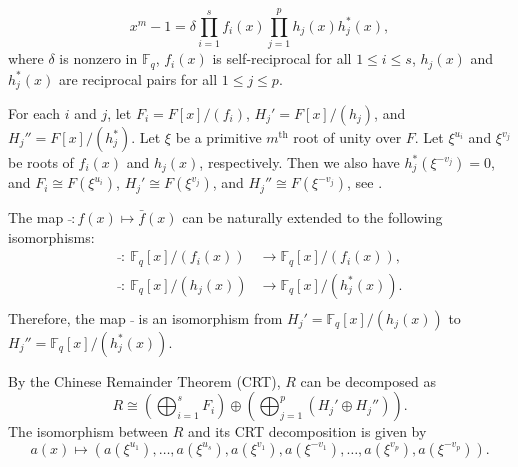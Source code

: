 \documentclass[a4paper,12pt]{article}
\begin{document}
$$
x^m-1= \delta \prod_{i=1}^sf_i(x) \prod_{j=1}^p h_j(x)h^*_j(x),
$$
where $\delta$ is nonzero in $\mathbb{F}_q$, $f_i(x)$ is self-reciprocal for all $1\le i \le s$,  $h_j(x)$   and $h_j^*(x)$ are reciprocal pairs for all $1 \le j \le p$.

For each $i$ and $j$, let $F_i=F[x]/  (f_i )$, 
$H_j'= F[x]/ (h_j )$,   and
$H_j''= F[x]/ (h_j^* )$. 
Let $\xi$ be a primitive $m^{\text{th}}$ root of unity over $F$.
Let $\xi^{u_i}$ and  $\xi^{v_j}$ be roots of $f_i(x)$ and $h_j(x)$, respectively.
Then we also have $h_j^*(\xi^{-v_j})=0$, and
$F_i \cong F(\xi^{u_i})$, $H_j' \cong F(\xi^{v_j})$, and $H_j'' \cong F(\xi^{-v_j})$, see \cite[p. 136]{guneri2021}.






The map $\bar\ : f(x) \mapsto \bar{f}(x)$ can be naturally extended to the following isomorphisms:   
\begin{equation}
	\begin{split}
		\bar\  :\  \mathbb{F}_{q}[x]/ (f_i(x) )&\to \mathbb{F}_{q}[x]/ (f_i (x)) ,\\
		\bar\  :\  \mathbb{F}_{q}[x]/ (h_j(x) )&\to \mathbb{F}_{q}[x]/ (h_j^*(x) ) .\\
	\end{split}
\end{equation} 
Therefore, the map $\bar\ $ is an isomorphism from $H_j'=\mathbb{F}_q[x]/ ( h_j(x))$ to 
$H_j''=\mathbb{F}_q[x]/ ( h_j^*(x) )$. 














By the Chinese Remainder Theorem (CRT), $R$ can be decomposed as
 $$
R \cong \left(\bigoplus_{i=1}^{s} F_i \right) 
\oplus
\left(\bigoplus_{j=1}^{p} \left( H_j'
\oplus  H_j'' \right) \right).
 $$ 
The isomorphism between $R$ and its CRT decomposition is given by 
\[
a(x) \mapsto \left(a(\xi^{u_1}), \dots, a(\xi^{u_s}),a(\xi^{v_1}),a(\xi^{-v_1}), \dots, a(\xi^{v_p}),a(\xi^{-v_p})\right). 
\]
\end{document}
